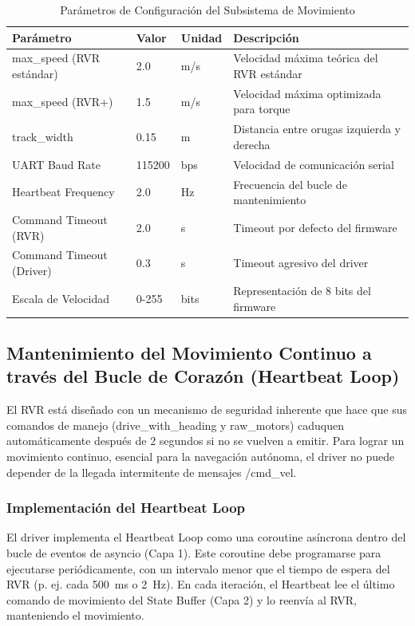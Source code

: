 \documentclass[11pt]{article}
\newcommand{\code}[1]{\textcolor{codeblue}{\url{#1}}}
\numberwithin{figure}{section}
\numberwithin{table}{section}
\def\code#1{#1}%
\begin{document}
\begin{table}[htbp]
\centering
\caption{Parámetros de Configuración del Subsistema de Movimiento}
\label{tab:parametros_movimiento}
\begin{tabular}{|p{}|p{}|p{}|p{}|}
\hline
\textbf{Parámetro} & \textbf{Valor} & \textbf{Unidad} & \textbf{Descripción} \\
\hline
\code{max\_speed} (RVR estándar) & 2.0 & m/s & Velocidad máxima teórica del RVR estándar \\
\hline
\code{max\_speed} (RVR+) & 1.5 & m/s & Velocidad máxima optimizada para torque \\
\hline
\code{track\_width} & 0.15 & m & Distancia entre orugas izquierda y derecha \\
\hline
UART Baud Rate & 115200 & bps & Velocidad de comunicación serial \\
\hline
Heartbeat Frequency & 2.0 & Hz & Frecuencia del bucle de mantenimiento \\
\hline
Command Timeout (RVR) & 2.0 & s & Timeout por defecto del firmware \\
\hline
Command Timeout (Driver) & 0.3 & s & Timeout agresivo del driver \\
\hline
Escala de Velocidad & 0-255 & bits & Representación de 8 bits del firmware \\
\hline
\end{tabular}
\end{table}


\subsection{Mantenimiento del Movimiento Continuo a través del Bucle de Corazón (Heartbeat Loop)}

El RVR está diseñado con un mecanismo de seguridad inherente que hace que sus comandos de manejo (\code{drive\_with\_heading} y \code{raw\_motors}) caduquen automáticamente después de 2 segundos si no se vuelven a emitir. Para lograr un movimiento continuo, esencial para la navegación autónoma, el driver no puede depender de la llegada intermitente de mensajes \code{/cmd\_vel}.


\subsubsection{Implementación del Heartbeat Loop}

El driver implementa el Heartbeat Loop como una coroutine asíncrona dentro del bucle de eventos de asyncio (Capa 1). Este coroutine debe programarse para ejecutarse periódicamente, con un intervalo menor que el tiempo de espera del RVR (p. ej. cada 500~ms o 2~Hz). En cada iteración, el Heartbeat lee el último comando de movimiento del State Buffer (Capa 2) y lo reenvía al RVR, manteniendo el movimiento.
\end{document}
